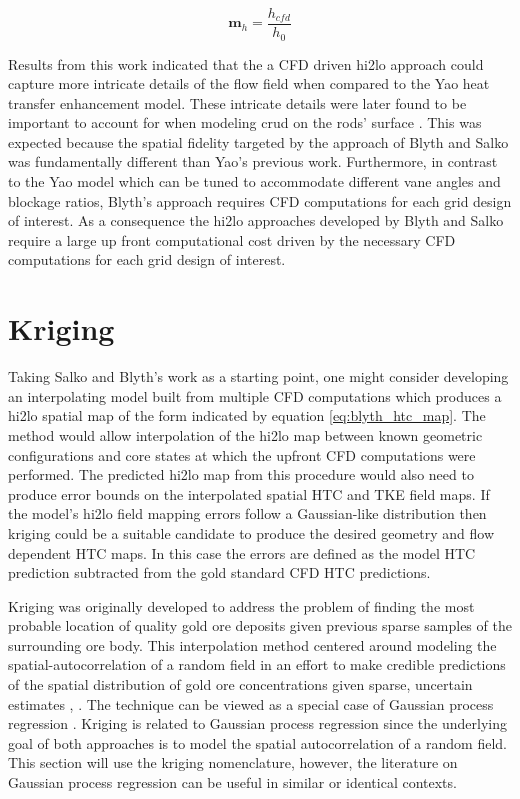 \begin{equation}
\mathbf m_h = \frac{h_{cfd}}{h_0}
\label{eq:blyth_htc_map}
\end{equation}

Results from this work indicated that the a CFD driven hi2lo approach could capture more intricate details of the flow field when compared to the Yao heat transfer enhancement model.  These intricate details were later found to be important to account for when modeling crud on the rods' surface \cite{slattery16}.   This was expected because the spatial fidelity targeted by the approach of Blyth and Salko was fundamentally different than Yao's previous work.  Furthermore, in contrast to the Yao model which can be tuned to accommodate different vane angles and blockage ratios,  Blyth's approach requires CFD computations for each grid design of interest. 
As a consequence the hi2lo approaches developed by Blyth and Salko require a large up front computational cost driven by the necessary CFD computations for each grid design of interest.

\section{Kriging}

Taking Salko and Blyth's work as a starting point, one might consider developing an interpolating model built from multiple CFD computations which produces a hi2lo spatial map of the form indicated by equation \ref{eq:blyth_htc_map}.  The method would allow interpolation of the hi2lo map between known geometric configurations and core states at which the upfront CFD computations were performed.  The predicted hi2lo map from this procedure would also need to produce error bounds on the interpolated spatial HTC and TKE field maps.  If the model's hi2lo field mapping errors follow a Gaussian-like distribution then kriging could be a suitable candidate to produce the desired geometry and flow dependent HTC maps.  In this case the errors are defined as the model HTC prediction subtracted from the gold standard CFD HTC predictions.

Kriging was originally developed to address the problem of finding the most probable location of quality gold ore deposits given previous sparse samples of the surrounding ore body.  This interpolation method centered around modeling the spatial-autocorrelation of a random field in an effort to make credible predictions of the spatial distribution of gold ore concentrations given sparse, uncertain estimates \cite{krige51}, \cite{Krige51a}.   The technique can be viewed as a special case of Gaussian process regression \cite{Williams96}.  Kriging is related to Gaussian process regression since the underlying goal of both approaches is to model the spatial autocorrelation of a random field.  This section will use the kriging nomenclature, however, the literature on Gaussian process regression can be useful in similar or identical contexts.

